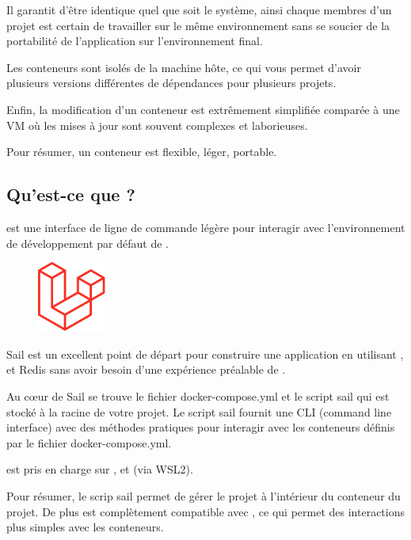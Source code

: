     Il garantit d'être identique quel que soit le système, ainsi chaque membres d'un projet est certain de travailler sur le même environnement sans se soucier de la portabilité de l'application sur l'environnement final.
    
    Les conteneurs sont isolés de la machine hôte, ce qui vous permet d'avoir plusieurs versions différentes de dépendances pour plusieurs projets.

    Enfin, la modification d'un conteneur est extrêmement simplifiée comparée à une VM où les mises à jour sont souvent complexes et laborieuses.

    Pour résumer, un conteneur \docker{} est flexible, léger, portable.

\subsection[Qu'est-ce que Laravel Sail?]{Qu'est-ce que \laravelsail{}?}
    
    \laravelsail{} est une interface de ligne de commande légère pour interagir avec l'environnement de développement \docker{} par défaut de \laravel{}. 
    
    \begin{figure}
        \centering
        \includegraphics[width=0.2\textwidth]{Images_formation/LaravelLogo.pdf}
    \end{figure}
    
    Sail est un excellent point de départ pour construire une application \laravel{} en utilisant \php{}, \mysql{} et Redis sans avoir besoin d'une expérience préalable de \docker{}.

    Au cœur de Sail se trouve le fichier docker-compose.yml et le script sail qui est stocké à la racine de votre projet. Le script sail fournit une CLI (command line interface) avec des méthodes pratiques pour interagir avec les conteneurs \docker{} définis par le fichier docker-compose.yml.

    \laravelsail{} est pris en charge sur \macos{}, \linux{} et \windows{} (via WSL2).

    Pour résumer, le scrip sail permet de gérer le projet \laravel{} à l'intérieur du conteneur du projet. De plus \laravelsail{} est complètement compatible avec \docker{}, ce qui permet des interactions plus simples avec les conteneurs.
